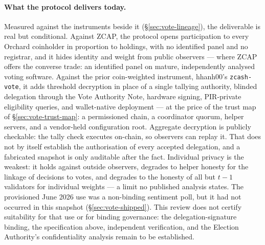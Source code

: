 \documentclass[11pt,a4paper]{article}
\theoremstyle{definition}
\begin{document}
\paragraph{What the protocol delivers today.} Measured against the
instruments beside it (\S\ref{sec:vote-lineage}), the deliverable is
real but conditional. Against ZCAP, the protocol opens participation to
every Orchard coinholder in proportion to holdings, with no identified
panel and no registrar, and it hides identity and weight from public
observers --- where ZCAP offers the converse trade: an identified panel
on mature, independently analysed voting software. Against the prior
coin-weighted instrument, hhanh00's \texttt{zcash-vote}, it adds
threshold decryption in place of a single tallying authority, blinded
delegation through the Vote Authority Note, hardware signing,
PIR-private eligibility queries, and wallet-native deployment --- at the
price of the trust map of \S\ref{sec:vote-trust-map}: a permissioned
chain, a coordinator quorum, helper servers, and a vendor-held
configuration root. Aggregate decryption is publicly checkable: the
tally check executes on-chain, so observers can replay it. That does not
by itself establish the authorisation of every accepted delegation, and
a fabricated snapshot is only auditable after the fact. Individual privacy is
the weakest: it holds against outside observers, degrades to helper
honesty for the linkage of decisions to votes, and degrades to the
honesty of all but $t-1$ validators for individual weights --- a limit no
published analysis states. The provisioned June 2026 use was a
non-binding sentiment poll, but it had not occurred in this snapshot
(\S\ref{sec:vote-shipped}). This review does not certify suitability for
that use or for binding governance: the delegation-signature binding,
the specification above, independent verification, and the Election
Authority's confidentiality analysis remain to be established.
\end{document}
